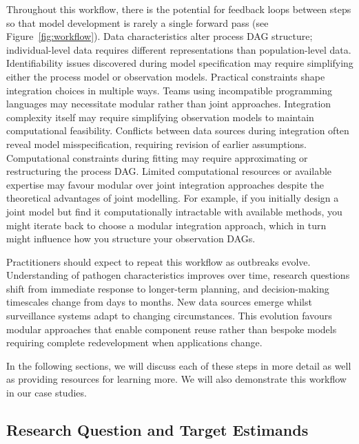 \documentclass{article}
\begin{document}
Throughout this workflow, there is the potential for feedback loops between steps so that model development is rarely a single forward pass (see Figure~\ref{fig:workflow}). 
Data characteristics alter process DAG structure; individual-level data requires different representations than population-level data. 
Identifiability issues discovered during model specification may require simplifying either the process model or observation models. 
Practical constraints shape integration choices in multiple ways. Teams using incompatible programming languages may necessitate modular rather than joint approaches. 
Integration complexity itself may require simplifying observation models to maintain computational feasibility. Conflicts between data sources during integration often reveal model misspecification, requiring revision of earlier assumptions. 
Computational constraints during fitting may require approximating or restructuring the process DAG. Limited computational resources or available expertise may favour modular over joint integration approaches despite the theoretical advantages of joint modelling. 
For example, if you initially design a joint model but find it computationally intractable with available methods, you might iterate back to choose a modular integration approach, which in turn might influence how you structure your observation DAGs.

Practitioners should expect to repeat this workflow as outbreaks evolve.
Understanding of pathogen characteristics improves over time, research questions shift from immediate response to longer-term planning, and decision-making timescales change from days to months.
New data sources emerge whilst surveillance systems adapt to changing circumstances.
This evolution favours modular approaches that enable component reuse rather than bespoke models requiring complete redevelopment when applications change.

In the following sections, we will discuss each of these steps in more detail as well as providing resources for learning more. We will also demonstrate this workflow in our case studies.

\subsection{Research Question and Target Estimands}
\end{document}
